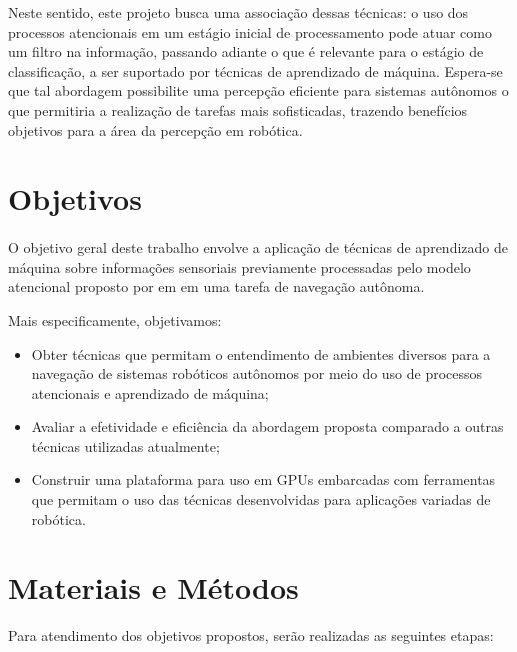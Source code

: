 \documentclass[11pt]{article}
\begin{document}
Neste sentido, este projeto busca uma associação dessas técnicas: o uso dos processos
atencionais em um estágio inicial de processamento pode atuar como um filtro
na informação, passando adiante o que é relevante para o estágio de
classificação, a ser suportado por técnicas de aprendizado de máquina. 
Espera-se que tal abordagem possibilite uma percepção eficiente para sistemas autônomos o que permitiria
a realização de tarefas mais sofisticadas, trazendo benefícios objetivos para
a área da percepção em robótica.

\section{Objetivos}
\paragraph{}
O objetivo geral deste trabalho envolve a aplicação de técnicas de aprendizado de máquina sobre informações sensoriais previamente processadas pelo modelo atencional proposto por em \cite{esther} em uma tarefa de navegação autônoma.  

Mais especificamente, objetivamos:
\begin{itemize}
	\item Obter técnicas que permitam o entendimento de ambientes
		diversos para a navegação de sistemas robóticos autônomos por meio 
		do uso de processos atencionais e aprendizado de máquina;
	\item Avaliar a efetividade e eficiência da abordagem proposta
		comparado a outras técnicas utilizadas atualmente;
	\item Construir uma plataforma para uso em GPUs embarcadas com 
		ferramentas que permitam o uso das técnicas desenvolvidas para
		aplicações variadas de robótica.
\end{itemize}

\section{Materiais e Métodos}

Para atendimento dos objetivos propostos, serão realizadas as seguintes etapas:
\end{document}
